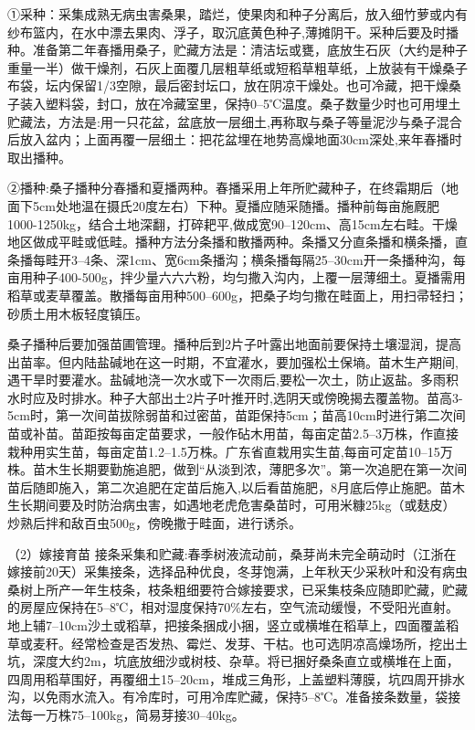 \documentclass{ctexbook}
\begin{document}
①采种：采集成熟无病虫害桑果，踏烂，使果肉和种子分离后，放入细竹萝或内有纱布篮内，在水中漂去果肉、浮子，取沉底黄色种子,薄摊阴干。采种后要及时播种。准备第二年春播用桑子，贮藏方法是：清洁坛或甕，底放生石灰（大约是种子重量一半）做干燥剂，石灰上面覆几层粗草纸或短稻草粗草纸，上放装有干燥桑子布袋，坛内保留1/3空隙，最后密封坛口，放在阴凉干燥处。也可冷藏，把干燥桑子装入塑料袋，封口，放在冷藏室里，保持0--5℃温度。桑子数量少时也可用埋土贮藏法，方法是:用一只花盆，盆底放一层细土,再称取与桑子等量泥沙与桑子混合后放入盆内；上面再覆一层细土：把花盆埋在地势高燥地面30cm深处,来年春播时取出播种。

②播种:桑子播种分春播和夏播两种。春播采用上年所贮藏种子，在终霜期后（地面下5cm处地温在摄氏20度左右）下种。夏播应随采随播。播种前每亩施厩肥1000-1250kg，结合土地深翻，打碎耙平,做成宽90--120cm、高15cm左右畦。干燥地区做成平畦或低畦。播种方法分条播和散播两种。条播又分直条播和横条播，直条播每畦开3--4条、深1cm、宽6cm条播沟；横条播每隔25--30cm开一条播种沟，每亩用种子400-500g，拌少量六六六粉，均匀撒入沟内，上覆一层薄细土。夏播需用稻草或麦草覆盖。散播每亩用种500--600g，把桑子均匀撒在畦面上，用扫帚轻扫；砂质土用木板轻度镇压。

桑子播种后要加强苗圃管理。播种后到2片子叶露出地面前要保持土壤湿润，提高出苗率。但内陆盐碱地在这一时期，不宜灌水，要加强松土保墒。苗木生产期间,遇干旱时要灌水。盐碱地浇一次水或下一次雨后,要松一次土，防止返盐。多雨积水时应及时排水。种子大部出土2片子叶推开时,选阴天或傍晚揭去覆盖物。苗高3-5cm时，第一次间苗拔除弱苗和过密苗，苗距保持5cm；苗高10cm时进行第二次间苗或补苗。苗距按每亩定苗要求，一般作砧木用苗，每亩定苗2.5--3万株，作直接栽种用实生苗，每亩定苗1.2--1.5万株。广东省直栽用实生苗,每亩可定苗10--15万株。苗木生长期要勤施追肥，做到“从淡到浓，薄肥多次”。第一次追肥在第一次间苗后随即施入，第二次追肥在定苗后施入,以后看苗施肥，8月底后停止施肥。苗木生长期间要及时防治病虫害，如遇地老虎危害桑苗时，可用米糠25kg（或麸皮）炒熟后拌和敌百虫500g，傍晚撒于畦面，进行诱杀。

（2）嫁接育苗
接条采集和贮藏:春季树液流动前，桑芽尚未完全萌动时（江浙在嫁接前20天）采集接条，选择品种优良，冬芽饱满，上年秋天少采秋叶和没有病虫桑树上所产一年生枝条，枝条粗细要符合嫁接要求，已采集枝条应随即贮藏，贮藏的房屋应保持在5--8℃，相对湿度保持70\%左右，空气流动缓慢，不受阳光直射。地上辅7--10cm沙土或稻草，把接条捆成小捆，竖立或横堆在稻草上，四面覆盖稻草或麦秆。经常检查是否发热、霉烂、发芽、干枯。也可选阴凉高燥场所，挖出土坑，深度大约2m，坑底放细沙或树枝、杂草。将已捆好桑条直立或横堆在上面，四周用稻草围好，再覆细土15--20cm，堆成三角形，上盖塑料薄膜，坑四周开排水沟，以免雨水流入。有冷库时，可用冷库贮藏，保持5--8℃。准备接条数量，袋接法每一万株75--100kg，简易芽接30--40kg。
\end{document}
